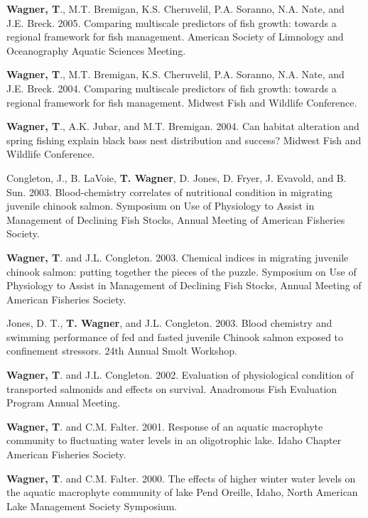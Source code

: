 \documentclass[10pt]{article}
\begin{document}
\begin{flushleft}
\begin{etaremune}
\item {\bf Wagner, T}., M.T. Bremigan, K.S. Cheruvelil, P.A. Soranno, N.A. Nate, and J.E. Breck. 2005. Comparing multiscale predictors of fish growth: towards a regional framework for fish management. American Society of Limnology and Oceanography Aquatic Sciences Meeting. 


\item {\bf Wagner, T}., M.T. Bremigan, K.S. Cheruvelil, P.A. Soranno, N.A. Nate, and J.E. Breck. 2004. Comparing multiscale predictors of fish growth: towards a regional framework for fish management. Midwest Fish and Wildlife Conference.

\item {\bf Wagner, T}., A.K. Jubar, and M.T. Bremigan. 2004. Can habitat alteration and spring fishing explain black bass nest distribution and success? Midwest Fish and Wildlife Conference.


\item Congleton, J., B. LaVoie, {\bf T. Wagner}, D. Jones, D. Fryer, J. Evavold, and B. Sun. 2003. Blood-chemistry correlates of nutritional condition in migrating juvenile chinook salmon. Symposium on Use of Physiology to Assist in Management of Declining Fish Stocks, Annual Meeting of American Fisheries Society.

\item {\bf Wagner, T}. and J.L. Congleton. 2003. Chemical indices in migrating juvenile chinook salmon: putting together the pieces of the puzzle. Symposium on Use of Physiology to Assist in Management of Declining Fish Stocks, Annual Meeting of American Fisheries Society.

\item Jones, D. T., {\bf T. Wagner}, and J.L. Congleton. 2003. Blood chemistry and swimming performance of fed and fasted juvenile Chinook salmon exposed to confinement stressors. 24th Annual Smolt Workshop.


\item {\bf Wagner, T}. and J.L. Congleton. 2002. Evaluation of physiological condition of transported salmonids and effects on survival. Anadromous Fish Evaluation Program Annual Meeting.


\item {\bf Wagner, T}. and C.M. Falter. 2001. Response of an aquatic macrophyte community to fluctuating water levels in an oligotrophic lake. Idaho Chapter American Fisheries Society.


\item {\bf Wagner, T}. and C.M. Falter. 2000. The effects of higher winter water levels on the aquatic macrophyte community of lake Pend Oreille, Idaho, North American Lake Management Society Symposium.



\end{etaremune}
\end{flushleft}
\end{document}
